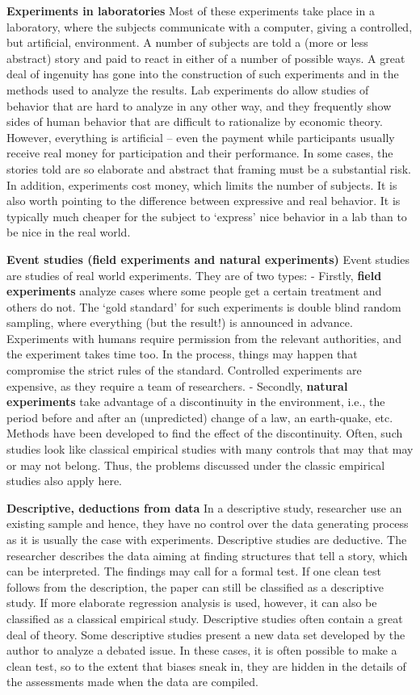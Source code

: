 \documentclass[
  12pt,
  oneside]{book}
\theoremstyle{definition}
\theoremstyle{definition}
\theoremstyle{definition}
\theoremstyle{definition}
\theoremstyle{remark}
\begin{document}
\textbf{Experiments in laboratories} Most of these experiments take place in a laboratory, where the subjects communicate with a computer, giving a controlled, but artificial, environment. A number of subjects are told a (more or less abstract) story and paid to react in either of a number of possible ways. A great deal of ingenuity has gone into the construction of such experiments and in the methods used to analyze the results. Lab experiments do allow studies of behavior that are hard to analyze in any other way, and they frequently show sides of human behavior that are difficult to rationalize by economic theory. However, everything is artificial -- even the payment while participants usually receive real money for participation and their performance. In some cases, the stories told are so elaborate and abstract that framing must be a substantial risk. In addition, experiments cost money, which limits the number of subjects. It is also worth pointing to the difference between expressive and real behavior. It is typically much cheaper for the subject to `express' nice behavior in a lab than to be nice in the real world.

\textbf{Event studies (field experiments and natural experiments)} Event studies are studies of real world experiments. They are of two types:
- Firstly, \textbf{field experiments} analyze cases where some people get a certain treatment and others do not. The `gold standard' for such experiments is double blind random sampling, where everything (but the result!) is announced in advance. Experiments with humans require permission from the relevant authorities, and the experiment takes time too. In the process, things may happen that compromise the strict rules of the standard. Controlled experiments are expensive, as they require a team of researchers.
- Secondly, \textbf{natural experiments} take advantage of a discontinuity in the environment, i.e., the period before and after an (unpredicted) change of a law, an earth-quake, etc. Methods have been developed to find the effect of the discontinuity. Often, such studies look like classical empirical studies with many controls that may that may or may not belong. Thus, the problems discussed under the classic empirical studies also apply here.

\textbf{Descriptive, deductions from data} In a descriptive study, researcher use an existing sample and hence, they have no control over the data generating process as it is usually the case with experiments. Descriptive studies are deductive. The researcher describes the data aiming at finding structures that tell a story, which can be interpreted. The findings may call for a formal test. If one clean test follows from the description, the paper can still be classified as a descriptive study. If more elaborate regression analysis is used, however, it can also be classified as a classical empirical study. Descriptive studies often contain a great deal of theory. Some descriptive studies present a new data set developed by the author to analyze a debated issue. In these cases, it is often possible to make a clean test, so to the extent that biases sneak in, they are hidden in the details of the assessments made when the data are compiled.
\end{document}
